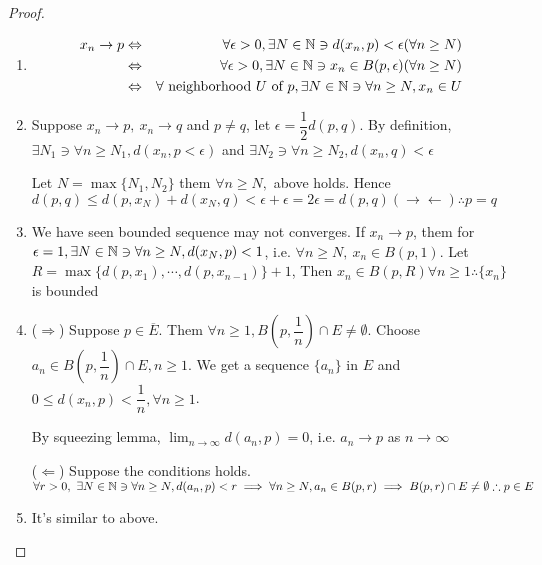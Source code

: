 \begin{proof} $ $
	\begin{enumerate}[wide,label = $(\alph*)$]
		\item \begin{eqnarray*}
			x_n \rightarrow p &\Leftrightarrow & \forall \epsilon > 0, \exists N \in \mathbb{N} \ni d(x_n,p) < \epsilon (\forall n \geq N)\\
			&\Leftrightarrow & \forall \epsilon > 0, \exists N \in \mathbb{N} \ni x_n \in B(p,\epsilon) (\forall n \geq N)\\
			&\Leftrightarrow & \forall \text{ neighborhood } U \text{ of } p, \exists N \in \mathbb{N} \ni \forall n \geq N, x_n \in U
		\end{eqnarray*}
		\item Suppose $x_n \rightarrow p,~x_n \rightarrow q$ and $p \neq q$, let $\epsilon = \dfrac{1}{2}d(p,q)$. By definition, $\exists N_1 \ni \forall n \geq N_1, d(x_n, p < \epsilon)$ and $\exists N_2 \ni \forall n \geq N_2, d(x_n,q) < \epsilon$
		
		Let $N = \max \{N_1,N_2\}$ them $\forall n \geq N, $ above holds. Hence $d(p,q) \leq d(p,x_N) + d(x_N,q) < \epsilon + \epsilon = 2 \epsilon = d(p,q) (\rightarrow \leftarrow) \therefore p = q$
		
		\item We have seen bounded sequence may not converges. If $x_n \rightarrow p$, them for $\epsilon = 1, \exists N \in \mathbb{N} \ni \forall n \geq N, d(x_N,p) < 1$, i.e. $\forall n \geq N,~x_n \in B(p,1)$. Let $R = \max \{d(p,x_1),\cdots,d(p,x_{n-1})\} + 1$, Then $x_n \in B(p,R) \forall n \geq 1 \therefore \{x_n\} $ is bounded
		\newpage
		\item ($\Rightarrow$) Suppose $p \in \overline{E}$. Them $\forall n \geq 1, B(p, \dfrac{1}{n}) \cap E \neq \emptyset$. Choose $a_n \in B(p,\dfrac{1}{n}) \cap E, n \geq 1$. We get a sequence $\{a_n\}$ in $E$ and $0 \leq d(x_n , p) < \dfrac{1}{n}, \forall n \geq 1$. 
		 
		By squeezing lemma, $\lim_{n \rightarrow \infty}d(a_n , p) =0$, i.e. $a_n \rightarrow p $ as $n \rightarrow \infty$
		
		($\Leftarrow$) Suppose the conditions holds. $\forall r > 0,~\exists N \in \mathbb{N} \ni \forall n \geq N, d(a_n, p) < r \implies \forall n \geq N , a_n \in B(p,r) \implies B(p,r) \cap E \neq \emptyset \therefore p \in E$
		
		\item It's similar to above.
		
	\end{enumerate}

\end{proof}


